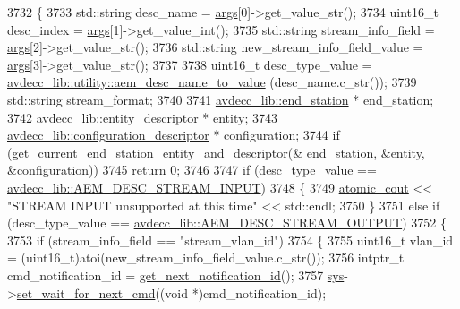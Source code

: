 \begin{DoxyCode}
3732 \{
3733     std::string desc\_name = \hyperlink{namespaceastime__fitline_a8187411843a6284ffb964ef3fb9fcab3}{args}[0]->get\_value\_str();
3734     uint16\_t desc\_index = \hyperlink{namespaceastime__fitline_a8187411843a6284ffb964ef3fb9fcab3}{args}[1]->get\_value\_int();
3735     std::string stream\_info\_field = \hyperlink{namespaceastime__fitline_a8187411843a6284ffb964ef3fb9fcab3}{args}[2]->get\_value\_str();
3736     std::string new\_stream\_info\_field\_value = \hyperlink{namespaceastime__fitline_a8187411843a6284ffb964ef3fb9fcab3}{args}[3]->get\_value\_str();
3737 
3738     uint16\_t desc\_type\_value = \hyperlink{namespaceavdecc__lib_1_1utility_a9f6076e32fa227555a95b6e95ea1e29b}{avdecc\_lib::utility::aem\_desc\_name\_to\_value}
      (desc\_name.c\_str());
3739     std::string stream\_format;
3740 
3741     \hyperlink{classavdecc__lib_1_1end__station}{avdecc\_lib::end\_station} * end\_station;
3742     \hyperlink{classavdecc__lib_1_1entity__descriptor}{avdecc\_lib::entity\_descriptor} * entity;
3743     \hyperlink{classavdecc__lib_1_1configuration__descriptor}{avdecc\_lib::configuration\_descriptor} * configuration;
3744     \textcolor{keywordflow}{if} (\hyperlink{classcmd__line_ac2d4611fba7db03d436a2e3c1e64828e}{get\_current\_end\_station\_entity\_and\_descriptor}(&
      end\_station, &entity, &configuration))
3745         \textcolor{keywordflow}{return} 0;
3746 
3747     \textcolor{keywordflow}{if} (desc\_type\_value == \hyperlink{namespaceavdecc__lib_ac7b7d227e46bc72b63ee9e9aae15902fa00d002e47651a1b007d50f9f2da51e53}{avdecc\_lib::AEM\_DESC\_STREAM\_INPUT})
3748     \{
3749         \hyperlink{cmd__line_8h_a0bc38ccc65c79ba06c6fcd7b4bf554c3}{atomic\_cout} << \textcolor{stringliteral}{"STREAM INPUT unsupported at this time"} << std::endl;
3750     \}
3751     \textcolor{keywordflow}{else} \textcolor{keywordflow}{if} (desc\_type\_value == \hyperlink{namespaceavdecc__lib_ac7b7d227e46bc72b63ee9e9aae15902fa3e5e9421e49598854000feaa2fe71464}{avdecc\_lib::AEM\_DESC\_STREAM\_OUTPUT})
3752     \{
3753         \textcolor{keywordflow}{if} (stream\_info\_field == \textcolor{stringliteral}{"stream\_vlan\_id"})
3754         \{
3755             uint16\_t vlan\_id = (uint16\_t)atoi(new\_stream\_info\_field\_value.c\_str());
3756             intptr\_t cmd\_notification\_id = \hyperlink{classcmd__line_a57486218387d1aa9d262eb7c176154ad}{get\_next\_notification\_id}();
3757             \hyperlink{classcmd__line_a485db4800e331cb4052c447fdf5d154e}{sys}->\hyperlink{classavdecc__lib_1_1system_a26b769584f10225077da47583edda33e}{set\_wait\_for\_next\_cmd}((\textcolor{keywordtype}{void} *)cmd\_notification\_id);

\end{DoxyCode}
